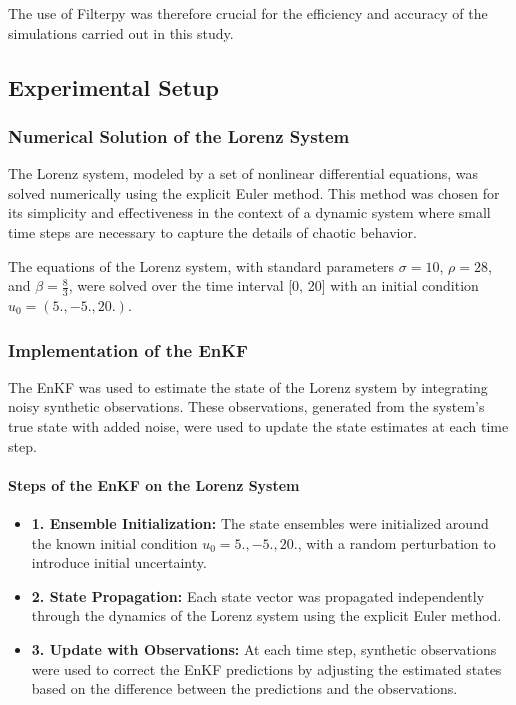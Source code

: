 \documentclass[a4paper,12pt,french]{article}
\begin{document}
The use of Filterpy was therefore crucial for the efficiency 
and accuracy of the simulations carried out in this study.

\subsection{Experimental Setup}
\subsubsection{Numerical Solution of the Lorenz System}
The Lorenz system, modeled by a set of nonlinear differential 
equations, was solved numerically using the explicit Euler 
method. This method was chosen for its simplicity and 
effectiveness in the context of a dynamic system where 
small time steps are necessary to capture the details of 
chaotic behavior.

The equations of the Lorenz system, with standard parameters 
$\sigma = 10$, $\rho = 28$, and $\beta = \frac{8}{3}$, 
were solved over the time interval [0, 20] with an initial 
condition $u_0= (5., -5., 20.)$.
\subsubsection{Implementation of the EnKF}

The EnKF was used to estimate the state of the Lorenz 
system by integrating noisy synthetic observations. 
These observations, generated from the system's true state 
with added noise, were used to update the state estimates 
at each time step.


\paragraph{Steps of the EnKF on the Lorenz System}
\vspace{0.5cm} 

\begin{itemize}
  \item \textbf{1. Ensemble Initialization:} The state ensembles were initialized around the known initial condition $u_0 = 5., -5., 20.$, with a random perturbation to introduce initial uncertainty.
  \item \textbf{2. State Propagation:} Each state vector was propagated independently through the dynamics of the Lorenz system using the explicit Euler method.
  \item \textbf{3. Update with Observations:} At each time step, synthetic observations were used to correct the EnKF predictions by adjusting the estimated states based on the difference between the predictions and the observations.
\end{itemize}
\end{document}
